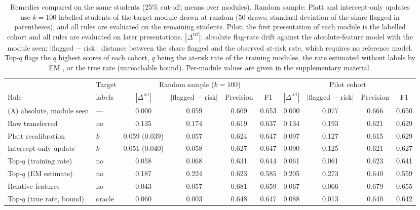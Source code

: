 \begin{table}[t]
\centering
\caption{Remedies compared on the same students (25\% cut-off; means over modules). Random sample: Platt and intercept-only updates use $k=100$ labelled students of the target module drawn at random (50 draws; standard deviation of the share flagged in parentheses), and all rules are evaluated on the remaining students. Pilot: the first presentation of each module is the labelled cohort and all rules are evaluated on later presentations. $|\Delta^{\mathrm{ref}}|$: absolute flag-rate drift against the absolute-feature model with the module seen; $|$flagged $-$ risk$|$: distance between the share flagged and the observed at-risk rate, which requires no reference model. Top-$q$ flags the $q$ highest scores of each cohort, $q$ being the at-risk rate of the training modules, the rate estimated without labels by EM \cite{saerens2002priors}, or the true rate (unreachable bound). Per-module values are given in the supplementary material.}
\label{tab:remedies}
\footnotesize
\begin{tabular}{@{}llcccccccc@{}}
\toprule
 & Target & \multicolumn{4}{c}{Random sample ($k=100$)} & \multicolumn{4}{c}{Pilot cohort} \\
\cmidrule(lr){3-6}\cmidrule(l){7-10}
Rule & labels & $|\Delta^{\mathrm{ref}}|$ & $|$flagged $-$ risk$|$ & Precision & F1 & $|\Delta^{\mathrm{ref}}|$ & $|$flagged $-$ risk$|$ & Precision & F1 \\
\midrule
(A) absolute, module seen & --- & 0.000 & 0.059 & 0.669 & 0.653 & 0.000 & 0.077 & 0.666 & 0.650 \\
Raw transferred & no & 0.135 & 0.174 & 0.619 & 0.637 & 0.134 & 0.193 & 0.621 & 0.629 \\
Platt recalibration & $k$ & 0.059 (0.039) & 0.057 & 0.624 & 0.647 & 0.097 & 0.127 & 0.615 & 0.629 \\
Intercept-only update & $k$ & 0.051 (0.040) & 0.058 & 0.627 & 0.647 & 0.090 & 0.125 & 0.621 & 0.627 \\
Top-$q$ (training rate) & no & 0.058 & 0.068 & 0.631 & 0.644 & 0.061 & 0.061 & 0.623 & 0.641 \\
Top-$q$ (EM estimate) & no & 0.187 & 0.224 & 0.623 & 0.585 & 0.205 & 0.273 & 0.640 & 0.559 \\
Relative features & no & 0.043 & 0.057 & 0.681 & 0.659 & 0.067 & 0.066 & 0.679 & 0.655 \\
Top-$q$ (true rate, bound) & oracle & 0.060 & 0.003 & 0.648 & 0.647 & 0.088 & 0.013 & 0.640 & 0.642 \\
\bottomrule
\end{tabular}
\end{table}
